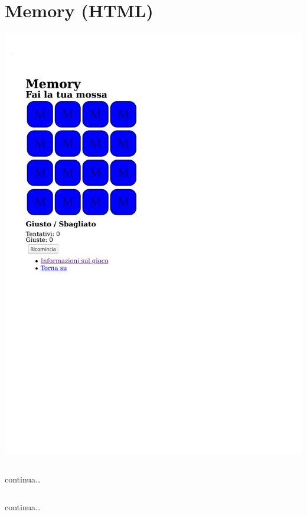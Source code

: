 \section[Memory]{Memory (HTML)}

\begin{frame}\transfade
  \begin{exercise}\centering
    \includegraphics[height=.85\textheight]{memory/html/memory.pdf}
  \end{exercise}
\end{frame}

\begin{frame}[fragile]\transfade
  \begin{sol}\centering
    \inputminted[lastline=17]{html}{memory/html/memory.html}
    continua\dots
  \end{sol}
\end{frame}
\begin{frame}[fragile]\transfade
  \begin{sol}\centering
    \inputminted[firstline=18, lastline=44, fontsize=\tiny]{html}{memory/html/memory.html}
    continua\dots
  \end{sol}
\end{frame}
\begin{frame}[fragile]\transfade
  \begin{sol}\centering
    \inputminted[firstline=46, breaklines]{html}{memory/html/memory.html}
  \end{sol}
\end{frame}